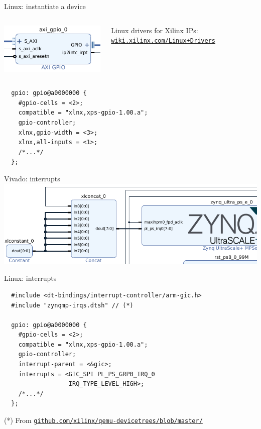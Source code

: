 \documentclass[xetex,table]{beamer}
\begin{document}
\begin{frame}[fragile]{Linux: instantiate a device}
  \begin{columns}
    \center\includegraphics[height=0.2\textheight]{images/block-design-gpio.png}

    Linux drivers for Xilinx IPs:
    \href{http://www.wiki.xilinx.com/Linux+Drivers}{\tt wiki.xilinx.com/Linux+Drivers}
  \end{columns}

  \begin{verbatim}
  gpio: gpio@a0000000 {
    #gpio-cells = <2>;
    compatible = "xlnx,xps-gpio-1.00.a";
    gpio-controller;
    xlnx,gpio-width = <3>;
    xlnx,all-inputs = <1>;
    /*...*/
  };
  \end{verbatim}
\end{frame}

\begin{frame}[fragile]{Vivado: interrupts}
  \center\includegraphics[width=1.0\textwidth]{images/block-design-interrupt.png}
\end{frame}

\begin{frame}[fragile]{Linux: interrupts}
  \begin{verbatim}
  #include <dt-bindings/interrupt-controller/arm-gic.h>
  #include "zynqmp-irqs.dtsh" // (*)

  gpio: gpio@a0000000 {
    #gpio-cells = <2>;
    compatible = "xlnx,xps-gpio-1.00.a";
    gpio-controller;
    interrupt-parent = <&gic>;
    interrupts = <GIC_SPI PL_PS_GRP0_IRQ_0
                  IRQ_TYPE_LEVEL_HIGH>;
    /*...*/
  };
  \end{verbatim}

  \footnotesize (*) From
  \href{https://github.com/xilinx/qemu-devicetrees/blob/master/zynqmp-irqs.dtsh}{\tt github.com/xilinx/qemu-devicetrees/blob/master/}
\end{frame}
\end{document}
